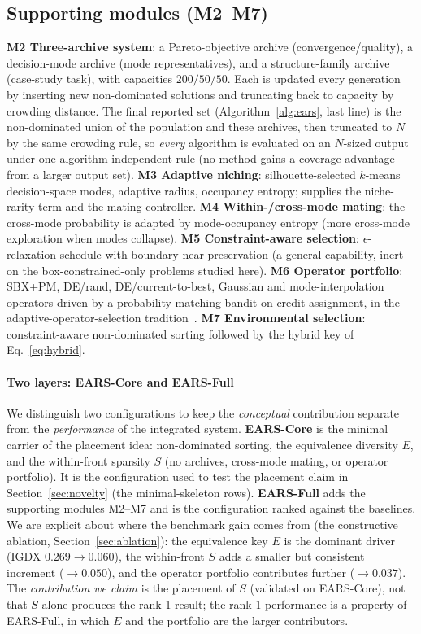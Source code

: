 \subsection{Supporting modules (M2--M7)}
\textbf{M2 Three-archive system}: a Pareto-objective archive (convergence/quality), a
decision-mode archive (mode representatives), and a structure-family archive
(case-study task), with capacities $200/50/50$. Each is updated every generation by inserting new
non-dominated solutions and truncating back to capacity by crowding distance. The final reported
set (Algorithm~\ref{alg:ears}, last line) is the non-dominated union of the population and these
archives, then truncated to $N$ by the same crowding rule, so \emph{every} algorithm is evaluated
on an $N$-sized output under one algorithm-independent rule (no method gains a coverage advantage
from a larger output set). \textbf{M3 Adaptive niching}: silhouette-selected $k$-means decision-space
modes, adaptive radius, occupancy entropy; supplies the niche-rarity term and the mating
controller. \textbf{M4 Within-/cross-mode mating}: the cross-mode probability is adapted
by mode-occupancy entropy (more cross-mode exploration when modes collapse).
\textbf{M5 Constraint-aware selection}: $\epsilon$-relaxation schedule with boundary-near
preservation (a general capability, inert on the box-constrained-only problems studied here).
\textbf{M6 Operator portfolio}:
SBX+PM, DE/rand, DE/current-to-best, Gaussian and mode-interpolation operators driven by a
probability-matching bandit on credit assignment, in the adaptive-operator-selection
tradition~\parencite{dacosta2008adaptive}. \textbf{M7 Environmental selection}:
constraint-aware non-dominated sorting followed by the hybrid key of
Eq.~\eqref{eq:hybrid}.

\paragraph{Two layers: EARS-Core and EARS-Full} We distinguish two configurations to keep the
\emph{conceptual} contribution separate from the \emph{performance} of the integrated system.
\textbf{EARS-Core} is the minimal carrier of the placement idea: non-dominated sorting, the
equivalence diversity $E$, and the within-front sparsity $S$ (no archives, cross-mode mating, or
operator portfolio). It is the configuration used to test the placement claim in
Section~\ref{sec:novelty} (the minimal-skeleton rows). \textbf{EARS-Full} adds the supporting
modules M2--M7 and is the configuration ranked against the baselines. We are explicit about where
the benchmark gain comes from (the constructive ablation, Section~\ref{sec:ablation}): the
equivalence key $E$ is the dominant driver (IGDX $0.269\!\to\!0.060$), the within-front $S$ adds a
smaller but consistent increment ($\to\!0.050$), and the operator portfolio contributes further
($\to\!0.037$). The \emph{contribution we claim} is the placement of $S$ (validated on EARS-Core),
not that $S$ alone produces the rank-1 result; the rank-1 performance is a property of EARS-Full,
in which $E$ and the portfolio are the larger contributors.

